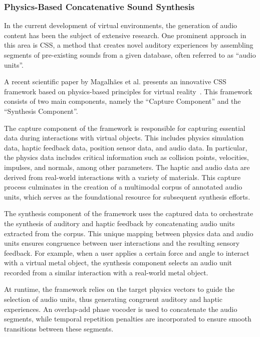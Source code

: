 \subsubsection{Physics-Based Concatenative Sound Synthesis}

In the current development of virtual environments, the generation of audio content has been the subject of extensive research. One prominent approach in this area is \acf{CSS}, a method that creates novel auditory experiences by assembling segments of pre-existing sounds from a given database, often referred to as ``audio units''.

A recent scientific paper by Magalhães et al. presents an innovative \ac{CSS} framework based on physics-based principles for virtual reality~\cite{magalhaes_physics-based_2020}. This framework consists of two main components, namely the ``Capture Component'' and the ``Synthesis Component''.

The capture component of the framework is responsible for capturing essential data during interactions with virtual objects. This includes physics simulation data, haptic feedback data, position sensor data, and audio data. In particular, the physics data includes critical information such as collision points, velocities, impulses, and normals, among other parameters. The haptic and audio data are derived from real-world interactions with a variety of materials. This capture process culminates in the creation of a multimodal corpus of annotated audio units, which serves as the foundational resource for subsequent synthesis efforts.

The synthesis component of the framework uses the captured data to orchestrate the synthesis of auditory and haptic feedback by concatenating audio units extracted from the corpus. This unique mapping between physics data and audio units ensures congruence between user interactions and the resulting sensory feedback. For example, when a user applies a certain force and angle to interact with a virtual metal object, the synthesis component selects an audio unit recorded from a similar interaction with a real-world metal object.

At runtime, the framework relies on the target physics vectors to guide the selection of audio units, thus generating congruent auditory and haptic experiences. An overlap-add phase vocoder is used to concatenate the audio segments, while temporal repetition penalties are incorporated to ensure smooth transitions between these segments.